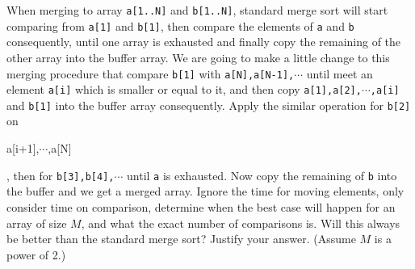 When merging to array {\tt a[1..N]} and {\tt b[1..N]}, standard merge 
sort will start comparing from {\tt a[1]} and {\tt b[1]}, then compare
the elements of {\tt a} and {\tt b} consequently, until one array
is exhausted and finally copy the remaining of the other array into
the buffer array. We are going to make a little change to this merging
procedure that compare {\tt b[1]} with {\tt a[N],a[N-1],$\cdots$} until
meet an element {\tt a[i]} which is smaller or equal to it, and then copy
{\tt a[1],a[2],$\cdots$,a[i]} and {\tt b[1]} into the buffer array
consequently. Apply the similar operation for {\tt b[2]} on {\tt

a[i+1],$\cdots$,a[N]}, then for {\tt b[3],b[4],$\cdots$} until {\tt a}
is exhausted. Now copy the remaining of {\tt b} into the buffer and
we get a merged array. Ignore the time for moving elements, only
consider time on comparison, determine when the best case will happen
for an array of size $M$, and what the exact number of comparisons is. 
Will this always be better than the standard merge sort? Justify
your answer. (Assume $M$ is a power of 2.)
